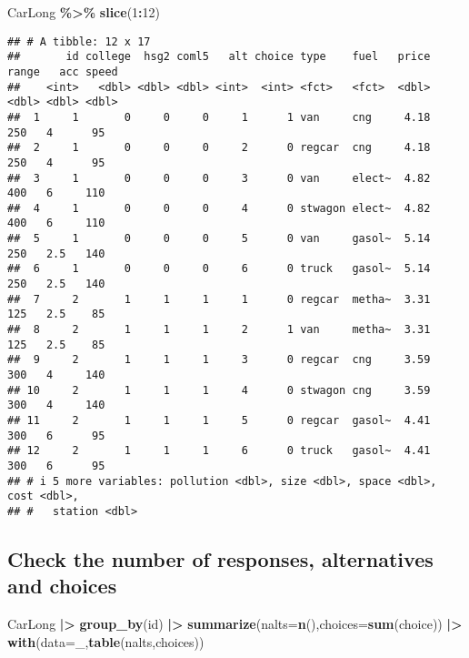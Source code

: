 \documentclass[
  11pt,
]{article}
\newenvironment{Shaded}{\begin{snugshade}}{\end{snugshade}}
\newcommand{\AttributeTok}[1]{\textcolor[rgb]{0.13,0.29,0.53}{#1}}
\newcommand{\DecValTok}[1]{\textcolor[rgb]{0.00,0.00,0.81}{#1}}
\newcommand{\FunctionTok}[1]{\textcolor[rgb]{0.13,0.29,0.53}{\textbf{#1}}}
\newcommand{\NormalTok}[1]{#1}
\newcommand{\SpecialCharTok}[1]{\textcolor[rgb]{0.81,0.36,0.00}{\textbf{#1}}}
\begin{document}
\footnotesize

\begin{Shaded}
\begin{Highlighting}[]
\NormalTok{CarLong }\SpecialCharTok{\%\textgreater{}\%} 
  \FunctionTok{slice}\NormalTok{(}\DecValTok{1}\SpecialCharTok{:}\DecValTok{12}\NormalTok{)}
\end{Highlighting}
\end{Shaded}

\begin{verbatim}
## # A tibble: 12 x 17
##       id college  hsg2 coml5   alt choice type    fuel   price range   acc speed
##    <int>   <dbl> <dbl> <dbl> <int>  <int> <fct>   <fct>  <dbl> <dbl> <dbl> <dbl>
##  1     1       0     0     0     1      1 van     cng     4.18   250   4      95
##  2     1       0     0     0     2      0 regcar  cng     4.18   250   4      95
##  3     1       0     0     0     3      0 van     elect~  4.82   400   6     110
##  4     1       0     0     0     4      0 stwagon elect~  4.82   400   6     110
##  5     1       0     0     0     5      0 van     gasol~  5.14   250   2.5   140
##  6     1       0     0     0     6      0 truck   gasol~  5.14   250   2.5   140
##  7     2       1     1     1     1      0 regcar  metha~  3.31   125   2.5    85
##  8     2       1     1     1     2      1 van     metha~  3.31   125   2.5    85
##  9     2       1     1     1     3      0 regcar  cng     3.59   300   4     140
## 10     2       1     1     1     4      0 stwagon cng     3.59   300   4     140
## 11     2       1     1     1     5      0 regcar  gasol~  4.41   300   6      95
## 12     2       1     1     1     6      0 truck   gasol~  4.41   300   6      95
## # i 5 more variables: pollution <dbl>, size <dbl>, space <dbl>, cost <dbl>,
## #   station <dbl>
\end{verbatim}

\normalsize

\hypertarget{check-the-number-of-responses-alternatives-and-choices}{%
\subsection{Check the number of responses, alternatives and
choices}\label{check-the-number-of-responses-alternatives-and-choices}}

\begin{Shaded}
\begin{Highlighting}[]
\NormalTok{CarLong }\SpecialCharTok{|\textgreater{}} 
  \FunctionTok{group\_by}\NormalTok{(id) }\SpecialCharTok{|\textgreater{}} 
  \FunctionTok{summarize}\NormalTok{(}\AttributeTok{nalts=}\FunctionTok{n}\NormalTok{(),}\AttributeTok{choices=}\FunctionTok{sum}\NormalTok{(choice)) }\SpecialCharTok{|\textgreater{}} 
  \FunctionTok{with}\NormalTok{(}\AttributeTok{data=}\NormalTok{\_,}\FunctionTok{table}\NormalTok{(nalts,choices))}
\end{Highlighting}
\end{Shaded}
\end{document}
